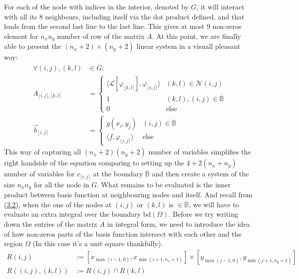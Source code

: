 \documentclass[]{article}
\begin{document}
    For each of the node with indices in the interior, denoted by $G$, it will interact with all its 8 neighbours, including itself via the dot product defined, and that leads from the second last line to the last line. This gives at most 9 non-zeros element for $n_xn_y$ number of row of the matrix $A$. At this point, we are finally able to present the $(n_x + 2)\times(n_y + 2)$ linear system in a visuall pleasant way: 
    \begin{align*}\tag{3.8}\label{eqn:3.8}
        \forall  (i,j), (k, l) &\in \overline{G}: 
        \\
        A_{\lfloor i,j \rceil, \lfloor k, l \rceil}
        &= 
        \begin{cases}
            \langle \mathcal{L}[\varphi_{\lfloor k, l \rceil}], \varphi_{\lfloor i,j \rceil}\rangle & (k, l) \in \mathcal{N}(i, j)
            \\
            1 & (k, l), (i, j) \in \overline{\mathbb{B}}
            \\
            0 & \text{else}
        \end{cases}
        \\
        \vec{b}_{\lfloor i,j \rceil} &= 
        \begin{cases}
            g(x_i, y_j) & (i, j)\in \overline{\mathbb{B}}
            \\
            \langle f,\varphi_{\lfloor i,j \rceil} \rangle & \text{else}
        \end{cases}
    \end{align*}
    This way of capturing all $(n_x + 2)(n_y + 2)$ number of variables simplifies the right handside of the equation comparing to setting up the $4 + 2(n_x + n_y)$ number of variables for $c_{\lfloor i, j\rceil}$ at the boundary $\overline{\mathbb{B}}$ and then create a system of the size $n_xn_y$ for all the node in $G$. What remains to be evaluated is the inner product between basis function at neighbouring nodes and itself. And recall from \hyperref[eqn:3.2]{(3.2)}, when the one of the nodes at $(i,j)$ or $(k, l)$ is $\in \overline{\mathbb{B}}$, we will have to evaluate an extra integral over the boundary $\text{bd}(\Omega)$. Before we try writing down the entries of the matrix $A$ in integral form, we need to introduce the idea of how non-zeros parts of the basis function intersect with each other and the region $\Omega$ (In this case it's a unit square thankfully). 
    \begin{align*}\tag{3.9}\label{eqn:3.9}
        R(i, j) &:= [x_{\max(i - 1, 0)}, x_{\min(i + 1, n_x + 1)}]\times 
        [y_{\max(j - 1, 0)}, y_{\min(j + 1, n_y + 1)}]
        \\
        R((i, j), (k, l)) &:= R(i, j)\cap R(k, l)
    \end{align*}
\end{document}
